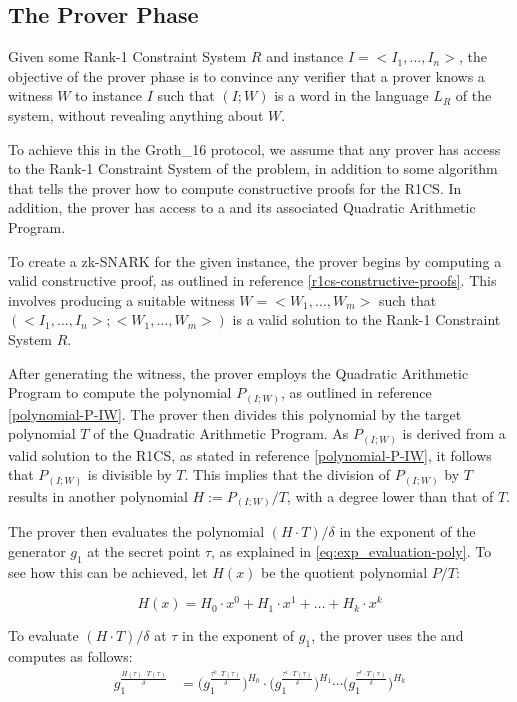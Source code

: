 \subsection{The Prover Phase} Given some Rank-1 Constraint System $R$ and instance $I=<I_1,\ldots, I_n>$, the objective of the prover phase is to convince any verifier that a prover knows a witness $W$ to instance $I$ such that  $(I;W)$ is a word in the language $L_R$ of the system, without revealing anything about $W$. 

To achieve this in the Groth\_16 protocol, we assume that any prover has access to the Rank-1 Constraint System of the problem, in addition to some algorithm that tells the prover how to compute constructive proofs for the R1CS. In addition, the prover has access to a  and its associated Quadratic Arithmetic Program. 

To create a zk-SNARK for the given instance, the prover begins by computing a valid constructive proof, as outlined in reference \ref{r1cs-constructive-proofs}. This involves producing a suitable witness $W=<W_1,\ldots,W_m>$ such that $(<I_1,\ldots, I_n>; <W_1,\ldots,W_m>)$ is a valid solution to the Rank-1 Constraint System $R$. 

After generating the witness, the prover employs the Quadratic Arithmetic Program to compute the polynomial $P_{(I;W)}$, as outlined in reference \ref{polynomial-P-IW}. The prover then divides this polynomial by the target polynomial $T$ of the Quadratic Arithmetic Program. As $P_{(I;W)}$ is derived from a valid solution to the R1CS, as stated in reference \ref{polynomial-P-IW}, it follows that $P_{(I;W)}$ is divisible by $T$. This implies that the division of $P_{(I;W)}$ by $T$ results in another polynomial $H:=P_{(I;W)} / T$, with a degree lower than that of $T$.

The prover then evaluates the polynomial $(H\cdot T)/\delta$ in the exponent of the generator $g_1$ at the secret point $\tau$, as explained in \ref{eq:exp_evaluation-poly}. To see how this can be achieved, let $H(x)$ be the quotient polynomial $P/T$:

\begin{equation}
H(x) = H_0\cdot x^0 + H_1\cdot x^1 +\ldots + H_k \cdot x^k
\end{equation}

To evaluate $(H\cdot T)/\delta$ at $\tau$ in the exponent of $g_1$, the prover uses the  and computes as follows:
\begin{align*}
g_1^{\frac{H(\tau)\cdot T(\tau)}{\delta}} 
 &= \Big(g_1^{\frac{\tau^0\cdot T(\tau)}{\delta}}\Big)^{H_0}\cdot \Big(g_1^{\frac{\tau^1\cdot T(\tau)}{\delta}}\Big)^{H_1}\cdots \Big(g_1^{\frac{\tau^k\cdot T(\tau)}{\delta}}\Big)^{H_k}
\end{align*}

